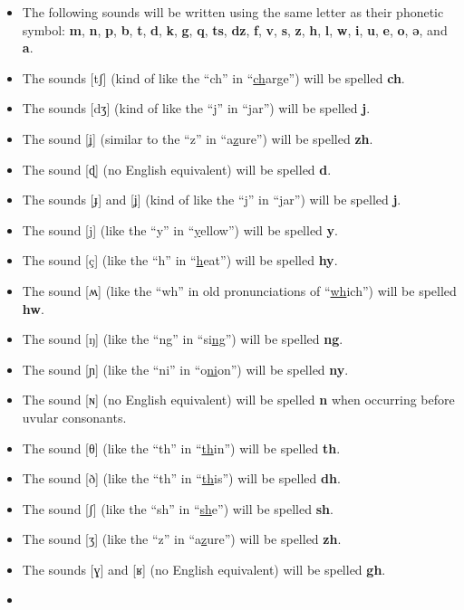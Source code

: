 \begin{itemize}
\item
The following sounds will be written using the same letter as their phonetic symbol:
\textbf{m},
\textbf{n},
\textbf{p},
\textbf{b},
\textbf{t},
\textbf{d},
\textbf{k},
\textbf{g},
\textbf{q},
\textbf{ts},
\textbf{dz},
\textbf{f},
\textbf{v},
\textbf{s},
\textbf{z},
\textbf{h},
\textbf{l},
\textbf{w},
\textbf{i},
\textbf{u},
\textbf{e},
\textbf{o},
\textbf{ǝ},
and \textbf{a}.
\item
The sounds [tʃ] (kind of like the ``ch'' in ``\uline{ch}arge'') will be spelled \textbf{ch}.
\item
The sounds [dʒ] (kind of like the ``j'' in ``\uline{j}ar'') will be spelled \textbf{j}.
\item
The sound [ʝ] (similar to the ``z'' in ``a\uline{z}ure'') will be spelled \textbf{zh}.
\item
The sound [ɖ] (no English equivalent) will be spelled \textbf{d}.
\item
The sounds [ɟ] and [ʝ] (kind of like the ``j'' in ``\uline{j}ar'') will be spelled \textbf{j}.
\item
The sound [j] (like the ``y'' in ``\uline{y}ellow'') will be spelled \textbf{y}.
\item
The sound [ç] (like the ``h'' in ``\uline{h}eat'') will be spelled \textbf{hy}.
\item
The sound [ʍ] (like the ``wh'' in old pronunciations of ``\uline{wh}ich'') will be spelled \textbf{hw}.
\item
The sound [ŋ] (like the ``ng'' in ``si\uline{ng}'') will be spelled \textbf{ng}.
\item
The sound [ɲ] (like the ``ni'' in ``o\uline{ni}on'') will be spelled \textbf{ny}.
\item
The sound [ɴ] (no English equivalent) will be spelled \textbf{n} when occurring before uvular consonants.
\item
The sound [θ] (like the ``th'' in ``\uline{th}in'') will be spelled \textbf{th}.
\item
The sound [ð] (like the ``th'' in ``\uline{th}is'') will be spelled \textbf{dh}.
\item
The sound [ʃ] (like the ``sh'' in ``\uline{sh}e'') will be spelled \textbf{sh}.
\item
The sound [ʒ] (like the ``z'' in ``a\uline{z}ure'') will be spelled \textbf{zh}.
\item
The sounds [ɣ] and [ʁ] (no English equivalent) will be spelled \textbf{gh}.
\item

\end{itemize}
